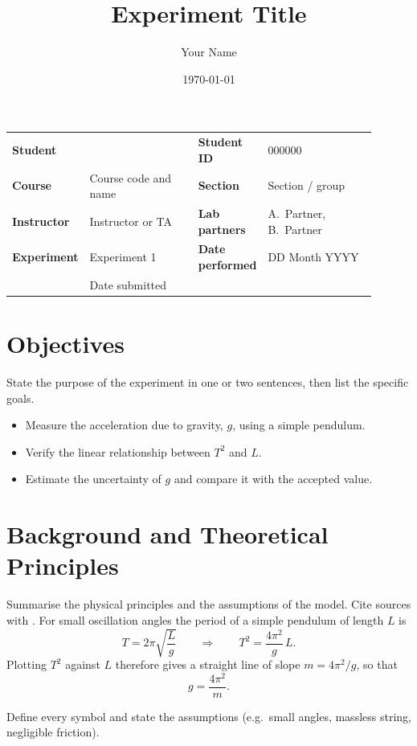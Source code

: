 \documentclass[12pt,a4paper]{article}
\title{Experiment Title}                       %
\author{Your Name}                             %
\date{\today}                                  %
\makeatletter
\newcommand{\ph}[1]{\textcolor{lpPlaceholder}{#1}}
\newcommand{\LabReportType}{Laboratory Report}
\newcommand{\LabStudentID}{\ph{000000}}
\newcommand{\LabCourse}{\ph{Course code and name}}
\newcommand{\LabSection}{\ph{Section / group}}
\newcommand{\LabInstructor}{\ph{Instructor or TA}}
\newcommand{\LabPartners}{\ph{A.~Partner, B.~Partner}}
\newcommand{\LabExperimentNo}{\ph{Experiment 1}}
\newcommand{\LabDatePerformed}{\ph{DD Month YYYY}}
\renewcommand{\maketitle}{%
  \begingroup
  \noindent{\lpHeadingFont\bfseries\footnotesize\color{lpAccent}\MakeUppercase{\LabReportType}\par}
  \vspace{5pt}
  \noindent{\lpHeadingFont\bfseries\fontsize{20}{24}\selectfont\color{lpBody}\@title\par}
  \vspace{7pt}
  \noindent{\color{lpAccent}\rule{\linewidth}{1.1pt}}\par
  \vspace{-4pt}
  \noindent{\color{lpRule}\rule{\linewidth}{0.4pt}}\par
  \vspace{2pt}
  \small\renewcommand{\arraystretch}{1.3}%
  \noindent\begin{tabular}{@{}>{\lpHeadingFont\bfseries\footnotesize\color{lpMuted}}p{0.14\linewidth}p{0.31\linewidth}%
                            >{\lpHeadingFont\bfseries\footnotesize\color{lpMuted}}p{0.14\linewidth}p{0.31\linewidth}@{}}
    Student        & \@author          & Student ID      & \LabStudentID \\
    Course         & \LabCourse        & Section         & \LabSection \\
    Instructor     & \LabInstructor    & Lab partners    & \LabPartners \\
    Experiment     & \LabExperimentNo  & Date performed  & \LabDatePerformed \\
    \multicolumn{2}{@{}l}{}            & Date submitted  & \@date \\
  \end{tabular}\par
  \vspace{2pt}
  \noindent{\color{lpRule}\rule{\linewidth}{0.4pt}}\par
  \vspace{6pt}
  \endgroup
  \thispagestyle{plain}}
\makeatother
\begin{document}
\maketitle

\section{Objectives}
\ph{State the purpose of the experiment in one or two sentences, then list the specific goals.}
\begin{itemize}
  \item \ph{Measure the acceleration due to gravity, $g$, using a simple pendulum.}
  \item \ph{Verify the linear relationship between $T^{2}$ and $L$.}
  \item \ph{Estimate the uncertainty of $g$ and compare it with the accepted value.}
\end{itemize}

\section{Background and Theoretical Principles}
\ph{Summarise the physical principles and the assumptions of the model. Cite sources with} \cite{taylor1997}.
For small oscillation angles the period of a simple pendulum of length $L$ is
\begin{equation}
  T = 2\pi\sqrt{\frac{L}{g}}
  \qquad\Longrightarrow\qquad
  T^{2} = \frac{4\pi^{2}}{g}\,L .
  \label{eq:period}
\end{equation}
Plotting $T^{2}$ against $L$ therefore gives a straight line of slope $m = 4\pi^{2}/g$, so that
\begin{equation}
  g = \frac{4\pi^{2}}{m}.
  \label{eq:g}
\end{equation}
\begin{labnote}
  \ph{Define every symbol and state the assumptions (e.g.\ small angles, massless string, negligible friction).}
\end{labnote}

\end{document}
